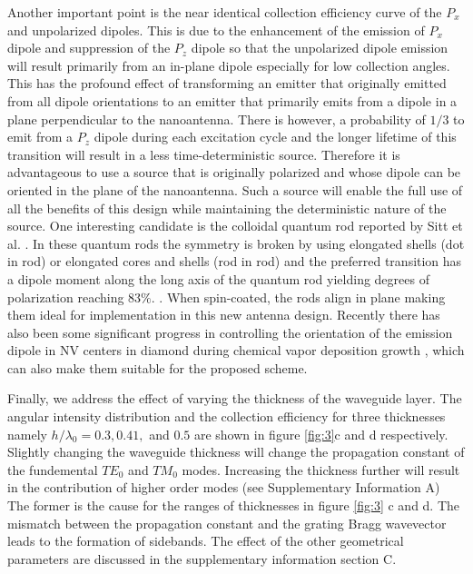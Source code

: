 \documentclass[10pt,onecolumn ]{article}
\begin{document}
Another important point is the near identical collection efficiency curve of the $P_x$ and unpolarized dipoles. 
This is due to the enhancement of the emission of $P_x$ dipole and suppression of the $P_z$ dipole so that the unpolarized dipole emission will result primarily from an in-plane dipole especially for low collection angles. 
This has the profound effect of transforming an emitter that originally emitted from all dipole orientations to an emitter that primarily emits from a dipole in a plane perpendicular to the nanoantenna. 
There is however, a probability of $1/3$ to emit from a $P_z$ dipole during each excitation cycle and the longer lifetime of this transition will result in a less time-deterministic source.
Therefore it is advantageous to use a source that is originally polarized and whose dipole can be oriented in the plane of the nanoantenna. 
Such a source will enable the full use of all the benefits of this design while maintaining the deterministic nature of the source. 
One interesting candidate is the colloidal quantum rod  reported by Sitt et al. \cite{Sitt2011HighlyPolarization}
. In these quantum rods the symmetry is broken by using elongated shells (dot in rod) or elongated cores and shells (rod in rod) and the preferred transition has a dipole moment along the long axis of the quantum rod yielding degrees of polarization reaching $83\%$. \cite{Hadar2013,Sitt2012}. When spin-coated, the rods align in plane making them ideal for implementation in this new antenna design. 
Recently there has also been some significant progress in controlling the orientation of the emission dipole in NV centers in diamond during chemical vapor deposition growth \cite{Schroder2016QuantumInvited}, which can also make them suitable for the proposed scheme.

Finally, we address the effect of varying the thickness of the waveguide layer.  The angular intensity distribution and the collection efficiency for three thicknesses namely $h/\lambda_0 = 0.3,0.41,$ and $0.5$ are shown in figure \ref{fig:3}c and d respectively. Slightly changing the waveguide thickness will change the propagation constant of the fundemental $TE_0$ and $TM_0$ modes. 
Increasing the thickness further will result in the contribution of higher order modes (see Supplementary Information A)
The former is the cause for the ranges of thicknesses in figure \ref{fig:3} c and d. 
The mismatch between the propagation constant and the grating Bragg wavevector leads to the formation of sidebands.  
The effect of the other geometrical parameters are discussed in the supplementary information section C. 
\end{document}
